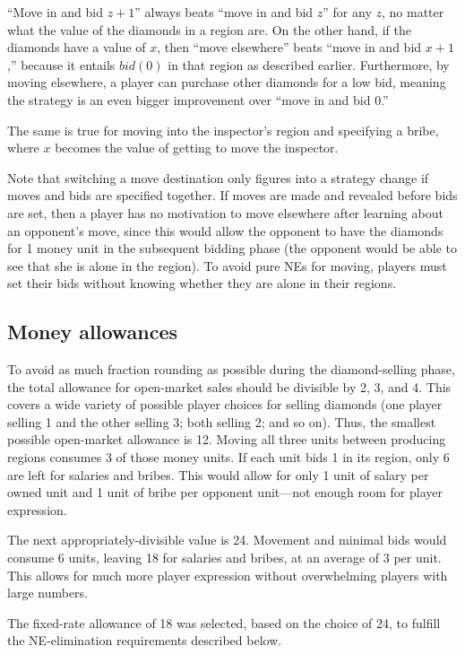 \documentclass[12pt]{article}
\begin{document}
``Move in and bid $z+1$'' always beats ``move in and bid $z$'' for any $z$, no matter what the value of the diamonds in a region are. On the other hand, if the diamonds have a value of $x$, then ``move elsewhere'' beats ``move in and bid $x+1$,'' because it entails $bid(0)$ in that region as described earlier.  Furthermore, by moving elsewhere, a player can purchase other diamonds for a low bid, meaning the strategy is an even bigger improvement over ``move in and bid 0.''

The same is true for moving into the inspector's region and specifying a bribe, where $x$ becomes the value of getting to move the inspector.

Note that switching a move destination only figures into a strategy change if moves and bids are specified together.  If moves are made and revealed before bids are set, then a player has no motivation to move elsewhere after learning about an opponent's move, since this would allow the opponent to have the diamonds for 1 money unit in the subsequent bidding phase (the opponent would be able to see that she is alone in the region).  To avoid pure NEs for moving, players must set their bids without knowing whether they are alone in their regions.

\subsection{Money allowances}
To avoid as much fraction rounding as possible during the diamond-selling phase, the total allowance for open-market sales should be divisible by 2, 3, and 4.  This covers a wide variety of possible player choices for selling diamonds (one player selling 1 and the other selling 3; both selling 2; and so on).  Thus, the smallest possible open-market allowance is 12.  Moving all three units between producing regions consumes 3 of those money units.  If each unit bids 1 in its region, only 6 are left for salaries and bribes.  This would allow for only 1 unit of salary per owned unit and 1 unit of bribe per opponent unit---not enough room for player expression.

The next appropriately-divisible value is 24.  Movement and minimal bids would consume 6 units, leaving 18 for salaries and bribes, at an average of 3 per unit.  This allows for much more player expression without overwhelming players with large numbers.

The fixed-rate allowance of 18 was selected, based on the choice of 24, to fulfill the NE-elimination requirements described below.
\end{document}
